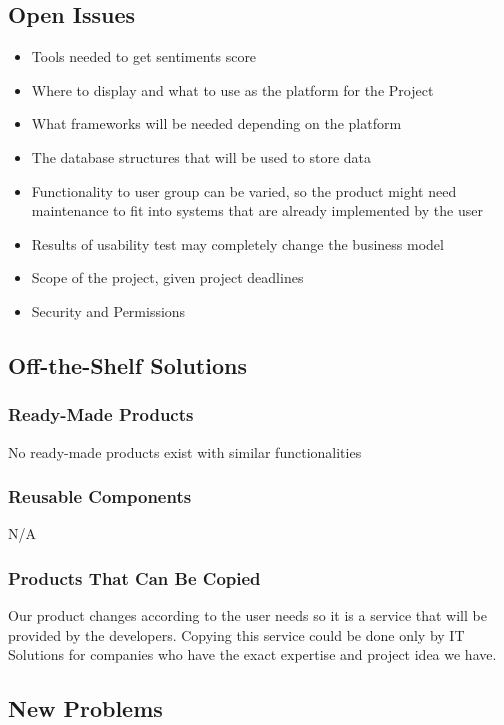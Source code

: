 \documentclass[12pt]{article}
\begin{document}
\subsection{Open Issues} 
\begin{itemize}
\item Tools needed to get sentiments score
\item Where to display and what to use as the platform for the Project
\item What frameworks will be needed depending on the platform
\item The database structures that will be used to store data
\item Functionality to user group can be varied, so the product might need maintenance to fit into systems that are already implemented by the user
\item Results of usability test may completely change the business model
\item Scope of the project, given project deadlines
\item Security and Permissions
\end{itemize}


\subsection{Off-the-Shelf Solutions} 

\subsubsection{Ready-Made Products}
No ready-made products exist with similar functionalities

\subsubsection{Reusable Components}
N/A

	
\subsubsection{Products That Can Be Copied}
Our product changes according to the user needs so it is a service that will be provided by the developers. Copying this service could be done only by IT Solutions for companies who have the exact expertise and project idea we have.



\subsection{New Problems}
\end{document}
